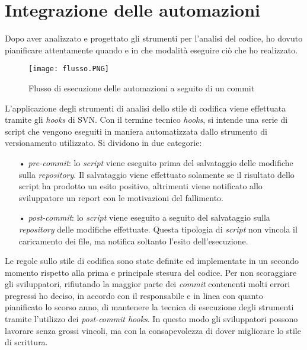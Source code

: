 \section{Integrazione delle automazioni}
Dopo aver analizzato e progettato gli strumenti per l'analisi del codice, ho dovuto pianificare attentamente quando e in che modalità eseguire ciò che ho realizzato. 

\begin{figure}[H]
  \centering
  \texttt{[image: flusso.PNG]}
  \caption{Flusso di esecuzione delle automazioni a seguito di un commit}
\end{figure}

L'applicazione degli strumenti di analisi dello stile di codifica viene effettuata tramite gli \textit{hooks} di SVN. 
Con il termine tecnico \textit{hooks}, si intende una serie di script che vengono eseguiti in maniera automatizzata dallo strumento di versionamento utilizzato. Si dividono in due categorie:
\begin{itemize}
\item[•] \textit{pre-commit}: lo \textit{script} viene eseguito prima del salvataggio delle modifiche sulla \textit{repository}. Il salvataggio viene effettuato solamente se il risultato dello script ha prodotto un esito positivo, altrimenti viene notificato allo sviluppatore un report con le motivazioni del fallimento.

\item[•] \textit{post-commit}: lo \textit{script} viene eseguito a seguito del salvataggio sulla \textit{repository} delle modifiche effettuate. Questa tipologia di \textit{script} non vincola il caricamento dei file, ma notifica soltanto l'esito dell'esecuzione.
\end{itemize}

Le regole sullo stile di codifica sono state definite ed implementate in un secondo momento rispetto alla prima e principale stesura del codice. Per non scoraggiare gli sviluppatori, rifiutando la maggior parte dei \textit{commit} contenenti molti errori pregressi ho deciso, in accordo con il responsabile e in linea con quanto pianificato lo scorso anno, di mantenere la tecnica di esecuzione degli strumenti tramite l'utilizzo dei \textit{post-commit hooks}. In questo modo gli sviluppatori possono lavorare senza grossi vincoli, ma con la consapevolezza di dover migliorare lo stile di scrittura. 

